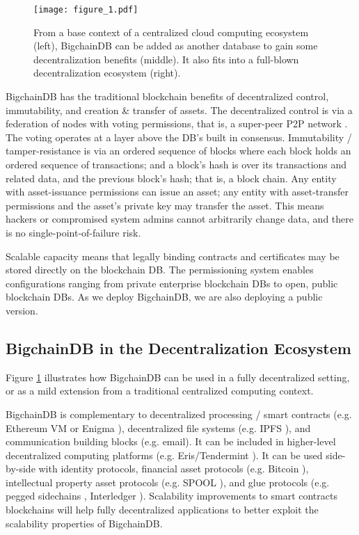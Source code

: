 \begin{figure}[!ht]
  \centering
  \texttt{[image: figure\_1.pdf]}
  \caption{From a base context of a centralized cloud computing ecosystem (left), BigchainDB can be added as another database to gain some decentralization benefits (middle).
  It also fits into a full-blown decentralization ecosystem (right).}
  \label{fig:bigchain_ecosystem}
\end{figure}

BigchainDB has the traditional blockchain benefits of decentralized control, immutability, and creation \& transfer of assets.
The decentralized control is via a federation of nodes with voting permissions, that is, a super-peer P2P network \cite{ozsu2011principles}.
The voting operates at a layer above the DB’s built in consensus.
Immutability / tamper-resistance is via an ordered sequence of blocks where each block holds an ordered sequence of transactions; and a block’s hash is over its transactions and related data, and the previous block’s hash; that is, a block chain.
Any entity with asset-issuance permissions can issue an asset; any entity with asset-transfer permissions and the asset’s private key may transfer the asset.
This means hackers or compromised system admins cannot arbitrarily change data, and there is no single-point-of-failure risk.

Scalable capacity means that legally binding contracts and certificates may be stored directly on the blockchain DB.
The permissioning system enables configurations ranging from private enterprise blockchain DBs to open, public blockchain DBs.
As we deploy BigchainDB, we are also deploying a public version.

\subsection{BigchainDB in the Decentralization Ecosystem}
Figure \ref{fig:bigchain_ecosystem} illustrates how BigchainDB can be used in a fully decentralized setting, or as a mild extension from a traditional centralized computing context.

BigchainDB is complementary to decentralized processing / smart contracts (e.g. Ethereum VM \cite{ethereum}\cite{buterin-ethereum} or Enigma \cite{enigma}\cite{zyskind2015enigma}), decentralized file systems (e.g. IPFS \cite{ipfs}), and communication building blocks (e.g. email).
It can be included in higher-level decentralized computing platforms (e.g. Eris/Tendermint \cite{eris}\cite{tendermint}).
It can be used side-by-side with identity protocols, financial asset protocols (e.g. Bitcoin \cite{nakamoto2009bitcoin}), intellectual property asset protocols (e.g. SPOOL \cite{dejonghe_spool}), and glue protocols (e.g. pegged sidechains \cite{back2010sidechains}, Interledger \cite{thomas2015interledger}).
Scalability improvements to smart contracts blockchains will help fully decentralized applications to better exploit the scalability properties of BigchainDB.

